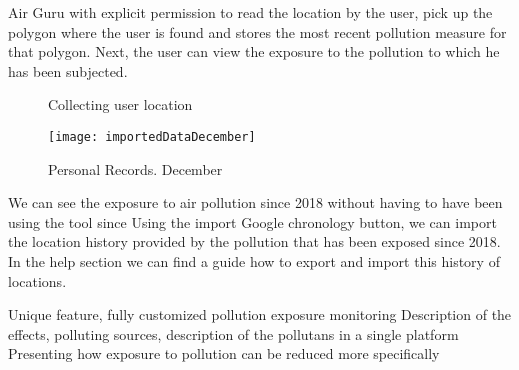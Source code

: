 Air Guru with explicit permission to read the location by the user, pick up the polygon where
the user is found and stores the most recent pollution measure for that polygon. Next, the
user can view the exposure to the pollution to which he has been subjected.
\begin{figure}[ht]
    \centering 
      \caption{Collecting user location}
    \end{figure}
    \begin{figure}[ht]
        \centering
        \texttt{[image: importedDataDecember]}
        \caption{Personal Records. December}
    \end{figure}
    We can see the exposure to air pollution since 2018 without having to have been using the tool since
    Using the import Google chronology button, we can import the location history provided by the
    pollution that has been exposed since 2018. In the help section we can find a guide how to
    export and import this history of locations.
\begin{itemize}
    \done Unique feature, fully customized pollution exposure monitoring
    \done Description of the effects, polluting sources, description of the pollutans in a single platform
    \crossed Presenting how exposure to pollution can be reduced more specifically
    
\end{itemize}